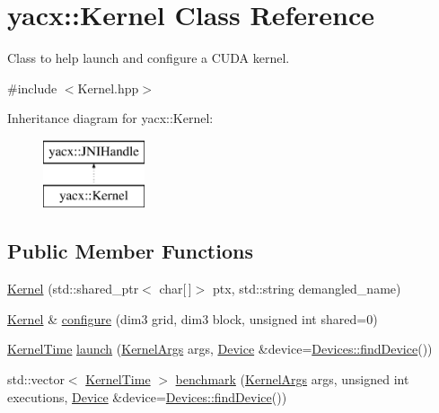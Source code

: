 \hypertarget{classyacx_1_1_kernel}{}\section{yacx\+:\+:Kernel Class Reference}
\label{classyacx_1_1_kernel}


Class to help launch and configure a C\+U\+DA kernel.  




{\ttfamily \#include $<$Kernel.\+hpp$>$}

Inheritance diagram for yacx\+:\+:Kernel\+:\begin{figure}[H]
\begin{center}
\leavevmode
\includegraphics[height=2.000000cm]{classyacx_1_1_kernel}
\end{center}
\end{figure}
\subsection*{Public Member Functions}
\begin{DoxyCompactItemize}
\item 
\hyperlink{classyacx_1_1_kernel_af0bb713a4f07eb8304525731d0d1a9f9}{Kernel} (std\+::shared\+\_\+ptr$<$ char\mbox{[}$\,$\mbox{]}$>$ ptx, std\+::string demangled\+\_\+name)
\item 
\hyperlink{classyacx_1_1_kernel}{Kernel} \& \hyperlink{classyacx_1_1_kernel_abebec8a3f9a5dd82fc5df38304806c9d}{configure} (dim3 grid, dim3 block, unsigned int shared=0)
\item 
\hyperlink{structyacx_1_1_kernel_time_struct}{Kernel\+Time} \hyperlink{classyacx_1_1_kernel_a6daf13c0526e7746e0419697e7f861d7}{launch} (\hyperlink{classyacx_1_1_kernel_args}{Kernel\+Args} args, \hyperlink{classyacx_1_1_device}{Device} \&device=\hyperlink{classyacx_1_1_devices_abaae9839d12e79117e2fb292ee0689fb}{Devices\+::find\+Device}())
\item 
std\+::vector$<$ \hyperlink{structyacx_1_1_kernel_time_struct}{Kernel\+Time} $>$ \hyperlink{classyacx_1_1_kernel_a9fcd39747a74696078246d405e3a671f}{benchmark} (\hyperlink{classyacx_1_1_kernel_args}{Kernel\+Args} args, unsigned int executions, \hyperlink{classyacx_1_1_device}{Device} \&device=\hyperlink{classyacx_1_1_devices_abaae9839d12e79117e2fb292ee0689fb}{Devices\+::find\+Device}())
\end{DoxyCompactItemize}


